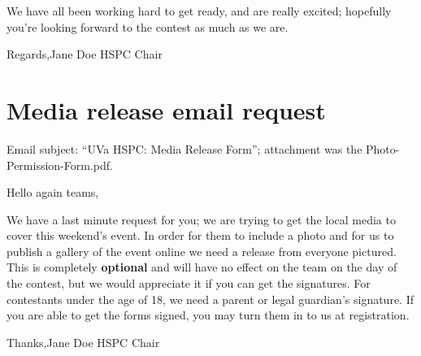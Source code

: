 \documentclass[11pt,twoside,letterpaper]{book}
\begin{document}
\noindent We have all been working hard to get ready, and are really
excited; hopefully you're looking forward to the contest as much as we
are.

\noindent Regards,\newline\noindent  Jane Doe \newline\noindent
HSPC Chair


\section{Media release email request}

Email subject: ``UVa HSPC: Media Release Form''; attachment was the
Photo-Permission-Form.pdf.

\noindent Hello again teams,

\noindent We have a last minute request for you; we are trying to get
the local media to cover this weekend's event. In order for them to
include a photo and for us to publish a gallery of the event online we
need a release from everyone pictured. This is completely {\bf
optional} and will have no effect on the team on the day of the
contest, but we would appreciate it if you can get the signatures. For
contestants under the age of 18, we need a parent or legal guardian's
signature. If you are able to get the forms signed, you may turn them
in to us at registration.

\noindent Thanks,\newline\noindent  Jane Doe \newline\noindent
HSPC Chair
\end{document}
